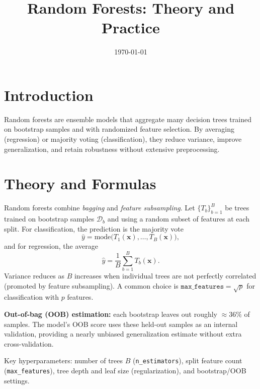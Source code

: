 \documentclass[11pt]{article}
\title{Random Forests: Theory and Practice}
\author{}
\date{\today}
\begin{document}
\maketitle

\section{Introduction}
Random forests are ensemble models that aggregate many decision trees trained on bootstrap samples and with randomized feature selection. By averaging (regression) or majority voting (classification), they reduce variance, improve generalization, and retain robustness without extensive preprocessing.

\section{Theory and Formulas}
Random forests combine \emph{bagging} and \emph{feature subsampling}. Let $\{T_b\}_{b=1}^B$ be trees trained on bootstrap samples $\mathcal{D}_b$ and using a random subset of features at each split.
For classification, the prediction is the majority vote
\begin{equation}
\hat{y} = \mathrm{mode}\big( T_1(\mathbf{x}),\dots,T_B(\mathbf{x}) \big),
\end{equation}
and for regression, the average
\begin{equation}
\hat{y} = \frac{1}{B} \sum_{b=1}^B T_b(\mathbf{x}).
\end{equation}
Variance reduces as $B$ increases when individual trees are not perfectly correlated (promoted by feature subsampling). A common choice is $\texttt{max\_features}=\sqrt{p}$ for classification with $p$ features.

\textbf{Out-of-bag (OOB) estimation:} each bootstrap leaves out roughly $\approx 36\%$ of samples. The model's OOB score uses these held-out samples as an internal validation, providing a nearly unbiased generalization estimate without extra cross-validation.

Key hyperparameters: number of trees $B$ (\texttt{n\_estimators}), split feature count (\texttt{max\_features}), tree depth and leaf size (regularization), and bootstrap/OOB settings.
\end{document}
